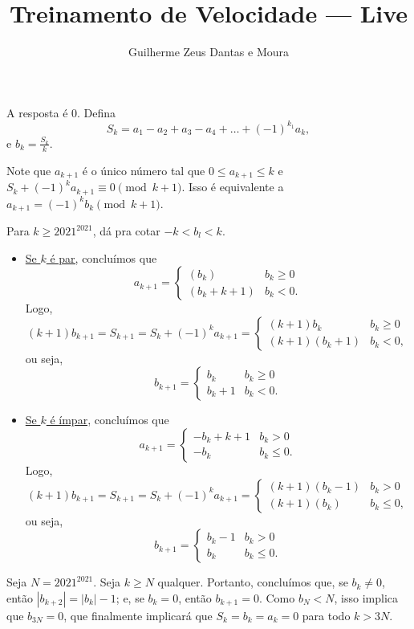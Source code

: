 \documentclass[10pt,a4paper]{scrartcl}
\title{Treinamento de Velocidade --- Live}
\author{Guilherme Zeus Dantas e Moura}
\begin{document}
	
	\zeustitle

	\begin{sk}
		A resposta é \(0\). Defina \[
			S_k = a_1 - a_2 + a_3 - a_4 + \dots + (-1)^{k_1} a_k,
		\]
		e \(b_k = \frac{S_k}{k}\).

		Note que \(a_{k+1}\) é o único número tal que \(0 \leq a_{k+1} \leq k\) e \(S_k + (-1)^{k}a_{k+1} \equiv 0 \pmod{k+1}\).
		Isso é equivalente a \(a_{k+1} = (-1)^{k}b_k \pmod{k+1}\).

		Para \(k \geq 2021^{2021}\), dá pra cotar  \(-k < b_l < k\).

		\begin{itemize}
			\item \underline{Se \(k\) é par,} concluímos que
				\[
					a_{k+1} =
					\begin{cases}
						(b_k) & b_k \geq 0 \\
						(b_k + k + 1) & b_k < 0.
					\end{cases}
				\]
				Logo, \[
					(k+1)b_{k+1} = S_{k+1} = S_{k} + (-1)^{k} a_{k+1} =
					\begin{cases}
						(k+1)b_k & b_k \geq 0 \\
						(k+1)(b_k+1) & b_k < 0,
					\end{cases}
				\]
				ou seja, \[
					b_{k+1} =
					\begin{cases}
						b_k & b_k \geq 0 \\
						b_k + 1 & b_k < 0.
					\end{cases}
				\]

			\item \underline{Se \(k\) é ímpar,} concluímos que
				\[
					a_{k+1} =
					\begin{cases}
						-b_k + k + 1 & b_k > 0 \\
						-b_k & b_k \leq 0.
					\end{cases}
				\]
				Logo, \[
					(k+1)b_{k+1} = S_{k+1} = S_{k} + (-1)^{k} a_{k+1} =
					\begin{cases}
						(k+1)(b_k-1) & b_k > 0 \\
						(k+1)(b_k) & b_k \leq 0,
					\end{cases}
				\]
				ou seja, \[
					b_{k+1} =
					\begin{cases}
						b_k - 1 & b_k > 0 \\
						b_k & b_k \leq 0.
					\end{cases}
				\]
		\end{itemize}

		Seja \(N = 2021^{2021}\).
		Seja \(k \geq N\) qualquer.
		Portanto, concluímos que, se \(b_k \neq 0\), então \(|b_{k + 2}| = |b_{k}| - 1\); e, se \(b_k = 0\), então \(b_{k+1} = 0\).
		Como \(b_{N} < N\), isso implica que \(b_{3N} = 0\), que finalmente implicará que \(S_k = b_{k} = a_{k} = 0\) para todo \(k > 3N\). 
	\end{sk}
\end{document}

